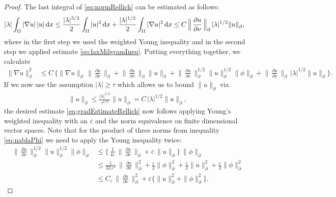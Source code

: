 \begin{proof}
  The last integral of \eqref{eq:normRellich} can be estimated as follows:
  \begin{align}
\label{eq:lambdaNablaU}
    |\lambda| \int_\Omega |\nabla u| \, |u| \, {\operatorname{d}\!{x}} 
    &\leq  \frac{|\lambda|^{3/2}}{2} \int_\Omega |u|^2 \, {\operatorname{d}\!{x}} + \frac{|\lambda|^{1/2}}{2 } \int_\Omega |\nabla u|^2 \, {\operatorname{d}\!{x}} \leq C \, \Big\| \, \frac{\partial u}{\partial \nu} \, \Big\|^{}_\partial \, |\lambda|^{1/2}  \| u \|^{}_\partial, 
  \end{align}
  where in the first step we used the weighted Young inequality and in the second step we applied estimate \eqref{eq:laxMilgramIneq}.
  Putting everything together, we calculate
  \begin{align*}
    \| \nabla u\|_\partial^2 
    &\leq C\, \bigg\{ \| \nabla u\|^{}_\partial \, \Big\|\,\frac{\partial u}{\partial \nu} \, \Big\|^{}_\partial 
    + \Big\|\,\frac{\partial u}{\partial \nu}\,\Big\|^{}_\partial \|u\|^{}_\partial 
    + \Big\|\,\frac{\partial u}{\partial \nu}\,\Big\|_\partial^{1/2} \|u\|_\partial^{1/2} \|\phi\|^{}_\partial 
    + \Big\|\,\frac{\partial u}{\partial \nu}\,\Big\|^{}_\partial \, |\lambda|^{1/2} \big\|  u \big\|^{}_\partial\bigg\}.
  \end{align*}
  If we now use the assumption $|\lambda| \geq \tau$ which allows us to bound $\|u\|^{}_\partial$ via
  \begin{align*}
      \|u\|^{}_\partial \leq \frac{|\lambda|^{1/2}}{\tau^{1/2}} \|u\|^{}_\partial = C \, |\lambda|^{1/2} \|u\|^{}_{\partial},
  \end{align*}
  the desired estimate \eqref{eq:gradEstimateRellich} now follows applying Young's weighted inequality with an $\varepsilon$ and the norm equivalence on finite dimensional vector spaces. 
  Note that for the product of three norms from inequality \eqref{eq:nablaPhi} we need to apply the Young inequality twice:
  \begin{align*}
      \Big\| \, \frac{\partial u}{\partial \nu} \, \Big\|_\partial^{1/2} \|u\|_\partial^{1/2} \|\phi\|^{}_\partial 
      &\leq \Big\{\, \frac{1}{4 \varepsilon}\, \Big\|\, \frac{\partial u}{\partial \nu}\, \Big\|^{}_\partial 
  + \varepsilon\, \|u\|^{}_\partial \Big\} \, \|\phi\|^{}_\partial  \\[0.5em]
  &\leq \frac{1}{32\, \varepsilon^3} \, \Big\|\, \frac{\partial u}{\partial \nu} \, \Big\|_\partial^2 + \frac{\varepsilon}{2} \|\phi\|_\partial^2 + \frac{\varepsilon}{2} \|u\|_\partial^2 + \frac{\varepsilon}{2} \|\phi\|_\partial^2 \\[0.5em]
    &\leq C_\varepsilon\,  \Big\|\, \frac{\partial u}{\partial\nu} \, \Big\|_\partial^2 + \varepsilon \Big\{ \|u\|_\partial^2 + \|\phi\|_\partial^2 \Big\}.
  \end{align*}


\end{proof}
